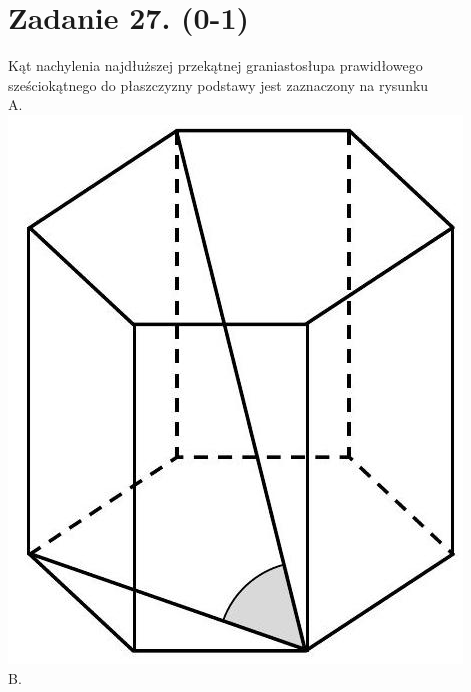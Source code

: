 \documentclass[10pt]{article}
\begin{document}
\section*{Zadanie 27. (0-1)}
Kąt nachylenia najdłuższej przekątnej graniastosłupa prawidłowego sześciokątnego do płaszczyzny podstawy jest zaznaczony na rysunku\\
A.\\
\includegraphics[max width=\textwidth, center]{2024_11_21_0a35d272448d5080a489g-20(2)}\\
B.\\
\end{document}
